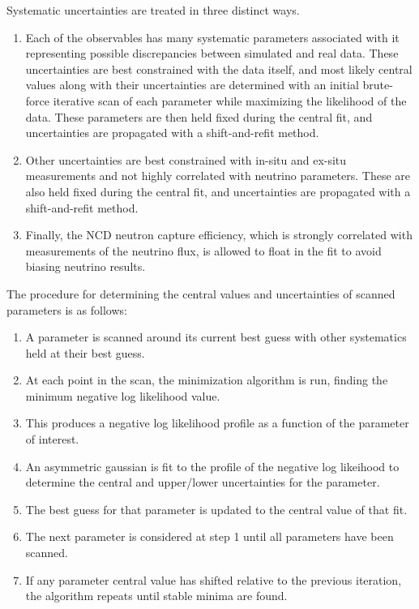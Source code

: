 Systematic uncertainties are treated in three distinct ways.
\begin{enumerate}
\item Each of the observables has many systematic parameters associated with it representing possible discrepancies between simulated and real data. These uncertainties are best constrained with the data itself, and most likely central values along with their uncertainties are determined with an initial brute-force iterative scan of each parameter while maximizing the likelihood of the data. These parameters are then held fixed during the central fit, and uncertainties are propagated with a shift-and-refit method.
\item Other uncertainties are best constrained with in-situ and ex-situ measurements and not highly correlated with neutrino parameters. These are also held fixed during the central fit, and uncertainties are propagated with a shift-and-refit method.
\item Finally, the NCD neutron capture efficiency, which is strongly correlated with measurements of the neutrino flux, is allowed to float in the fit to avoid biasing neutrino results.
\end{enumerate}

The procedure for determining the central values and uncertainties of scanned parameters is as follows:
\begin{enumerate}
\item A parameter is scanned around its current best guess with other systematics held at their best guess.
\item At each point in the scan, the minimization algorithm is run, finding the minimum negative log likelihood value.
\item This produces a negative log likelihood profile as a function of the parameter of interest.
\item An asymmetric gaussian is fit to the profile of the negative log likeihood to determine the central and upper/lower uncertainties for the parameter.
\item The best guess for that parameter is updated to the central value of that fit.
\item The next parameter is considered at step 1 until all parameters have been scanned.
\item If any parameter central value has shifted relative to the previous iteration, the algorithm repeats until stable minima are found.
\end{enumerate}

